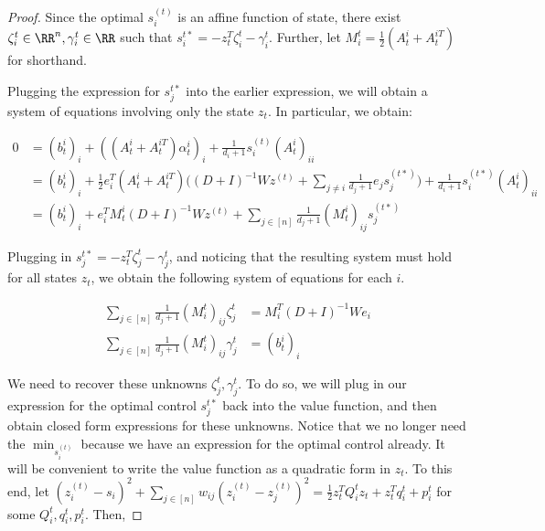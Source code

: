 \begin{proof}
Since the optimal $s_i^{(t)}$ is an affine function of state, there exist $\zeta_i^t \in \RR^n, \gamma_i^t \in \RR$ such that $s_i^{t *} = - z_t^T \zeta_i^t - \gamma_i^t$. Further, let $M_i^t = \frac 1 2 (A_t^i + A_{t}^{i T})$ for shorthand. 

Plugging the expression for $s_j^{t *}$ into the earlier expression, we will obtain a system of equations involving only the state $z_t$. In particular, we obtain: 

\begin{align*}
0 &= 
(b_t^i)_i + ((A_t^i + A_t^{iT}) \alpha_t^i)_{i}
+ \frac{1}{d_i + 1} s_{i}^{(t)} (A_t^i)_{ii} \\
&= (b_t^i)_i + 
\frac 1 2 e_i^T (A_t^i + A_t^{iT})
\big((D + I)^{-1} W z^{(t)} + \sum_{j \neq i} \frac{1}{d_{j} + 1} e_j s_j^{(t *)}
\big)
+ \frac{1}{d_i + 1} s_{i}^{(t *)} (A_t^i)_{ii} \\
&= (b_t^i)_i + e_i^T M_t^i (D + I)^{-1} W z^{(t)}
+ \sum\limits_{j \in [n]} \frac{1}{d_j + 1} (M_t^i)_{ij} s_{j}^{(t *)}
\end{align*}

Plugging in $s_j^{t *} = - z_t^T \zeta_j^t - \gamma_j^t$, and noticing that the resulting system must hold for all states $z_t$, we obtain the following system of equations for each $i$. 

\begin{align*}
\sum\limits_{j \in [n]} \frac{1}{d_j + 1} (M_i^t)_{ij} \zeta_j^t 
&= M_i^T (D + I)^{-1} W e_i \\
\sum\limits_{j \in [n]} \frac{1}{d_j + 1} (M_i^t)_{ij} \gamma_j^t 
&= (b_t^i)_i
\end{align*}

We need to recover these unknowns $\zeta_j^t, \gamma_j^t$. To do so, we will plug in our expression for the optimal control $s_{j}^{t *}$ back into the value function, and then obtain closed form expressions for these unknowns. Notice that we no longer need the $\min_{s_i^{(t)}}$ because we have an expression for the optimal control already. It will be convenient to write the value function as a quadratic form in $z_t$. To this end, let $(z_i^{(t)} - s_i)^2 + \sum_{j \in [n]} w_{ij} (z_i^{(t)} - z_j^{(t)})^2 = \frac 1 2 z_t^T Q_i^t z_t + z_t^T q_i^t + p_i^t$ for some $Q_i^t, q_i^t, p_i^t$. Then, 



\end{proof}
